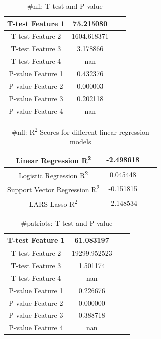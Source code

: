\documentclass[12pt]{article}
\begin{document}
\begin{table}[H]
	\centering
	\begin{tabular}{| c | c | c | c |}
		\hline 
		T-test Feature 1 & 75.215080 \\\hline
		T-test Feature 2 & 1604.618371 \\\hline
		T-test Feature 3 & 3.178866 \\\hline 
		T-test Feature 4 & nan \\\hline
		P-value Feature 1 & 0.432376 \\\hline
		P-value Feature 2 & 0.000003 \\\hline
		P-value Feature 3 & 0.202118 \\\hline
		P-value Feature 4 & nan \\\hline
	\end{tabular} 
	\caption{\#nfl: T-test and P-value}
	\label{part1:tab1}
\end{table} 


\begin{table}[H]
	\centering
	\begin{tabular}{| c | c | c | c |}
		\hline 
		Linear Regression R\textsuperscript2  & -2.498618 \\\hline
		Logistic Regression R\textsuperscript2  & 0.045448 \\\hline
		Support Vector Regression R\textsuperscript2  & -0.151815 \\\hline
		LARS Lasso R\textsuperscript2  & -2.148534 \\\hline
	\end{tabular} 
	\caption{\#nfl: R\textsuperscript2 Scores for different linear regression models}
	\label{part1:tab1}
\end{table} 

\begin{table}[H]
	\centering
	\begin{tabular}{| c | c | c | c |}
		\hline 
		T-test Feature 1 & 61.083197 \\\hline
		T-test Feature 2 & 19299.952523 \\\hline
		T-test Feature 3 & 1.501174 \\\hline 
		T-test Feature 4 & nan \\\hline
		P-value Feature 1 & 0.226676 \\\hline
		P-value Feature 2 & 0.000000 \\\hline
		P-value Feature 3 & 0.388718 \\\hline
		P-value Feature 4 & nan \\\hline
	\end{tabular} 
	\caption{\#patriots: T-test and P-value}
	\label{part1:tab1}
\end{table} 
\end{document}
